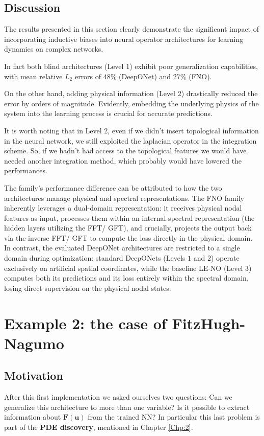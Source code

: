 \subsection{Discussion}

The results presented in this section clearly demonstrate the significant impact of incorporating inductive biases into neural operator architectures
 for learning dynamics on complex networks.

 In fact both blind architectures (Level 1) exhibit poor generalization capabilities, with mean relative $L_2$ errors of $48\%$ (DeepONet) and $27\%$ (FNO).

On the other hand, adding physical information (Level 2) drastically reduced the error by orders of magnitude.
Evidently, embedding the underlying physics of the system into the learning process is crucial for accurate predictions.

It is worth noting that in Level 2, even if we didn't insert topological information in the neural network,
we still exploited the laplacian operator in the integration scheme. So, if we hadn't had access to the topological features we would have needed another integration method, which probably would have lowered the performances.

The family's performance difference can be attributed to how the two architectures manage physical and spectral representations. The FNO family inherently leverages a dual-domain representation: it receives physical nodal features as input, processes them within an internal spectral representation (the hidden layers utilizing the FFT/ GFT), and crucially, projects the output back via the inverse FFT/ GFT to compute the loss directly in the physical domain. In contrast, the evaluated DeepONet architectures are restricted to a single domain during optimization: standard DeepONets (Levels $1$ and $2$) operate exclusively on artificial spatial coordinates, while the baseline LE-NO (Level $3$) computes both its predictions and its loss entirely within the spectral domain, losing direct supervision on the physical nodal states.


\section{Example 2: the case of FitzHugh-Nagumo}
\label{sec:Example 2}
\subsection{Motivation}
After this first implementation we asked ourselves two questions: Can we generalize this architecture to more than one variable? 
Is it possible to extract information about $\mathbf{F}(\mathbf{u})$ from the trained NN?
\newline
In particular this last problem is part of the \textbf{PDE discovery}, mentioned in Chapter \ref{Chp:2}.

